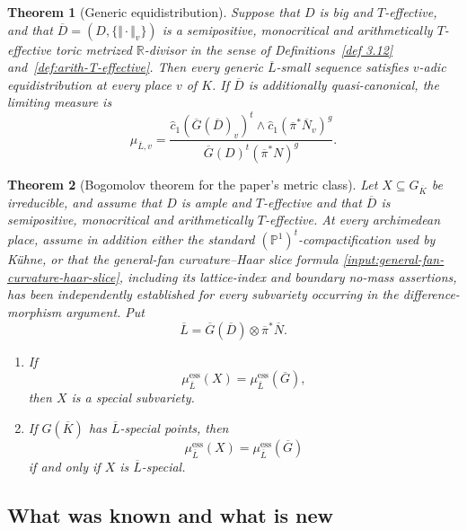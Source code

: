 \documentclass[10pt,a4paper]{amsart}
\theoremstyle{plain}
\theoremstyle{plain}
\newtheorem{thm}{Theorem}[section] \newtheorem{cor}[thm]{Corollary}
\numberwithin{equation}{section}
\begin{document}
\begin{thm}[Generic equidistribution]\label{thm:intro-generic-equidistribution}
	Suppose that \(D\) is big and \(T\)-effective, and that
	\(\overline D=(D,\{\Vert\cdot\Vert_v\})\) is a semipositive, monocritical and
	arithmetically \(T\)-effective toric metrized \(\mathbb R\)-divisor in the
	sense of Definitions~\ref{def 3.12} and~\ref{def:arith-T-effective}.  Then
	every generic \(\overline L\)-small sequence satisfies \(v\)-adic
	equidistribution at every place \(v\) of \(K\).  If \(\overline D\) is
	additionally quasi-canonical, the limiting measure is
	\[
	\mu_{\overline{L},v}
	=
	\frac{
		\hat{c}_1(\overline{G}(\overline{D})_v)^t
		\wedge
		\hat{c}_1(\overline{\pi}^*\overline{N}_v)^g
	}{
		\overline{G}(D)^t(\overline{\pi}^*N)^g
	}.
	\]
\end{thm}


\begin{thm}[Bogomolov theorem for the paper's metric class]
	\label{thm:intro-bogomolov}
	Let \(X\subseteq G_{\overline K}\) be irreducible, and assume that \(D\) is ample
	and \(T\)-effective and that \(\overline D\) is semipositive, monocritical and
	arithmetically \(T\)-effective.  At every archimedean place, assume in addition
	either the standard \((\mathbb P^1)^t\)-compactification used by K\"uhne, or
	that the general-fan curvature--Haar slice formula
	\ref{input:general-fan-curvature-haar-slice}, including its lattice-index and
	boundary no-mass assertions, has been independently established for every
	subvariety occurring in the difference-morphism argument.  Put
	\[
	\overline L
	=\overline G(\overline D)\otimes\overline\pi^*\overline N .
	\]
	\begin{enumerate}[label=\textup{(\arabic*)},leftmargin=2em]
		\item If
		\[
		\mu^{\mathrm{ess}}_{\overline{L}}(X)
		=
		\mu^{\mathrm{ess}}_{\overline{L}}(\overline{G}),
		\]
		then \(X\) is a special subvariety.
		\item If \(G(\overline K)\) has \(\overline L\)-special points, then
		\[
		\mu^{\mathrm{ess}}_{\overline{L}}(X)
		=
		\mu^{\mathrm{ess}}_{\overline{L}}(\overline{G})
		\]
		if and only if \(X\) is \(\overline L\)-special.
	\end{enumerate}
\end{thm}

\subsection*{What was known and what is new}
\end{document}
